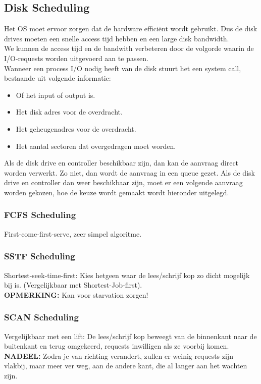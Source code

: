 \subsection{Disk Scheduling}
Het OS moet ervoor zorgen dat de hardware effici\"{e}nt wordt gebruikt. Dus de disk drives moeten een snelle access tijd hebben en een large disk bandwidth.
 \\ We kunnen de access tijd en de bandwith verbeteren door de volgorde waarin de I/O-requests worden uitgevoerd aan te passen. \\ Wanneer een process I/O nodig heeft van de disk stuurt het een system call, bestaande uit volgende informatie: \begin{itemize}
	\item Of het input of output is.
	\item Het disk adres voor de overdracht.
	\item Het geheugenadres voor de overdracht.
	\item Het aantal sectoren dat overgedragen moet worden.
\end{itemize}
Als de disk drive en controller beschikbaar zijn, dan kan de aanvraag direct worden verwerkt. Zo niet, dan wordt de aanvraag in een queue gezet. Als de disk drive en controller dan weer beschikbaar zijn, moet er een volgende aanvraag worden gekozen, hoe de keuze wordt gemaakt wordt hieronder uitgelegd.
\subsubsection{FCFS Scheduling}

First-come-first-serve, zeer simpel algoritme.
\subsubsection{SSTF Scheduling}
Shortest-seek-time-first: Kies hetgeen waar de lees/schrijf kop zo dicht mogelijk bij is. (Vergelijkbaar met Shortest-Job-first). \\ \textbf{OPMERKING:} Kan voor starvation zorgen!
\subsubsection{SCAN Scheduling}
Vergelijkbaar met een lift: De lees/schrijf kop beweegt van de binnenkant naar de buitenkant en terug omgekeerd, requests inwilligen als ze voorbij komen. \\ \textbf{NADEEL:} Zodra je van richting verandert, zullen er weinig requests zijn vlakbij, maar meer ver weg, aan de andere kant, die al langer aan het wachten zijn.
